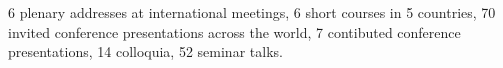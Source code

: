 \documentclass[11pt]{article}
\begin{document}
6 plenary addresses at international meetings,
6 short courses in 5 countries,
70 invited conference presentations across the world,
7 contibuted conference presentations,
14 colloquia,
52 seminar talks.


\end{document}
